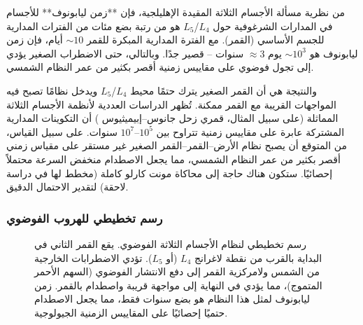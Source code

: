 \documentclass[11pt,a4paper]{article}
\begin{document}
	من نظرية مسألة الأجسام الثلاثة المقيدة الإهليلجية، فإن **زمن ليابونوف** للأجسام في المدارات الشرغوفية حول \(L_4\)/\(L_5\) هو من رتبة بضع مئات من الفترات المدارية للجسم الأساسي (القمر).  
	مع الفترة المدارية المبكرة للقمر \(\sim 10\) أيام، فإن زمن ليابونوف هو \(\sim 10^{3}\) يوم \(\approx 3\) سنوات – قصير جدًا. وبالتالي، حتى الاضطراب الصغير يؤدي إلى تجول فوضوي على مقاييس زمنية أقصر بكثير من عمر النظام الشمسي.
	
	والنتيجة هي أن القمر الصغير يترك حتمًا محيط \(L_4\)/\(L_5\) ويدخل نظامًا تصبح فيه المواجهات القريبة مع القمر ممكنة. تُظهر الدراسات العددية لأنظمة الأجسام الثلاثة المماثلة (على سبيل المثال، قمري زحل جانوس–إبيميثيوس \cite{JanusEpimetheus}) أن التكوينات المدارية المشتركة عابرة على مقاييس زمنية تتراوح بين \(10^{5}\)–\(10^{7}\) سنوات.  
	على سبيل القياس، من المتوقع أن يصبح نظام الأرض–القمر–القمر الصغير غير مستقر على مقياس زمني أقصر بكثير من عمر النظام الشمسي، مما يجعل الاصطدام منخفض السرعة محتملاً إحصائيًا. ستكون هناك حاجة إلى محاكاة مونت كارلو كاملة (مخطط لها في دراسة لاحقة) لتقدير الاحتمال الدقيق.
	
	\subsubsection{رسم تخطيطي للهروب الفوضوي}
	
	\begin{figure}[H]
		\centering
		\caption{رسم تخطيطي لنظام الأجسام الثلاثة الفوضوي. يقع القمر الثاني في البداية بالقرب من نقطة لاغرانج \(L_4\) (أو \(L_5\)). تؤدي الاضطرابات الخارجية من الشمس ولامركزية القمر إلى دفع الانتشار الفوضوي (السهم الأحمر المتموج)، مما يؤدي في النهاية إلى مواجهة قريبة واصطدام بالقمر. زمن ليابونوف لمثل هذا النظام هو بضع سنوات فقط، مما يجعل الاصطدام حتميًا إحصائيًا على المقاييس الزمنية الجيولوجية.}
		\label{fig:threebody}
	\end{figure}
	
\end{document}
